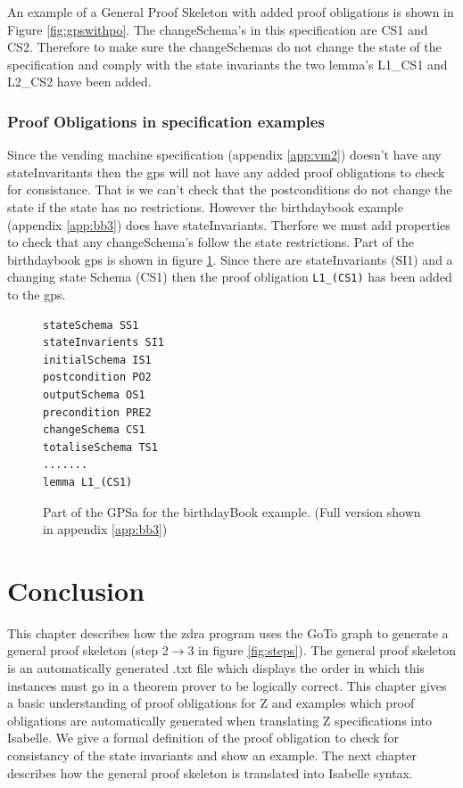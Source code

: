 An example of a General Proof Skeleton with added proof obligations is shown in Figure \ref{fig:gpswithpo}. The changeSchema's in this specification are CS1 and CS2. Therefore to make sure the changeSchemas do not change the state of the specification and comply with the state invariants the two lemma's L1\_CS1 and L2\_CS2 have been added.

\subsubsection{Proof Obligations in specification examples}
Since the vending machine specification (appendix \ref{app:vm2}) doesn't have any stateInvaritants then the \gls{gps} will not have any added proof obligations to check for consistance. That is we can't check that the postconditions do not change the state if the state has no restrictions. However the birthdaybook example (appendix \ref{app:bb3}) does have stateInvariants. Therfore we must add properties to check that any changeSchema's follow the state restrictions. Part of the birthdaybook \gls{gps} is shown in figure \ref{fig:bbgps}. Since there are stateInvariants (SI1) and a changing state Schema (CS1) then the proof obligation \texttt{L1\_(CS1)} has been added to the \gls{gps}.

\begin{figure}[H]
\begin{verbatim}
stateSchema SS1 
stateInvarients SI1 
initialSchema IS1 
postcondition PO2 
outputSchema OS1 
precondition PRE2 
changeSchema CS1 
totaliseSchema TS1 
.......
lemma L1_(CS1) 
\end{verbatim}
\caption{Part of the GPSa for the birthdayBook example. (Full version shown in appendix \ref{app:bb3}) \label{fig:bbgps}}
\end{figure}

\section{Conclusion}
\label{sec:skeletonsConclusion}

This chapter describes how the \gls{zdra} program uses the GoTo graph to generate a general proof skeleton (step 2$\rightarrow$3 in figure \ref{fig:steps}). The general proof skeleton is an automatically generated .txt file which displays the order in which this instances must go in a theorem prover to be logically correct. This chapter gives a basic understanding of proof obligations for Z and examples which proof obligations are automatically generated when translating Z specifications into Isabelle. We give a formal definition of the proof obligation to check for consistancy of the state invariants and show an example. The next chapter describes how the general proof skeleton is translated into Isabelle syntax.